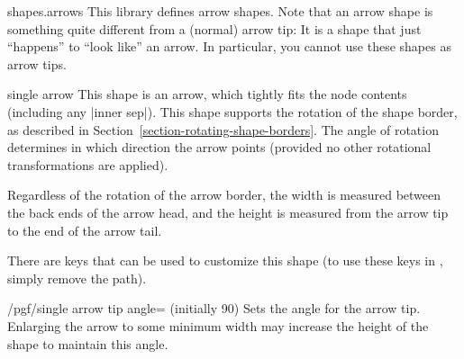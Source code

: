 \begin{pgflibrary}{shapes.arrows}
  This library defines arrow shapes. Note that an arrow shape is
  something quite different from a (normal) arrow tip: It is a shape
  that just ``happens'' to ``look like'' an arrow. In particular, you
  cannot use these shapes as arrow tips.
\end{pgflibrary}

\begin{shape}{single arrow}
	This shape is an arrow, which tightly fits the node contents
	(including any |inner sep|).
	This shape supports the rotation of the shape border, as
	described in Section~\ref{section-rotating-shape-borders}.
	The angle of rotation determines in which direction the arrow
	points (provided no other rotational transformations are applied).
	
\begin{codeexample}[]
\end{codeexample}

	Regardless of the rotation of the arrow border, the width is
  measured between the back ends of the arrow head, and the
  height is measured from the arrow tip to the end of the arrow
  tail.

\begin{codeexample}[]
\end{codeexample}

	There are \pgfname{} keys that can be used to customize this shape (to
	use these keys in \tikzname{}, simply remove the 
	path).
	
\begin{key}{/pgf/single arrow tip angle= (initially 90)}
  Sets the angle for the arrow tip. Enlarging the arrow to some
  minimum width may increase the height of the shape to maintain
  this angle.
\end{key}


\end{shape}
